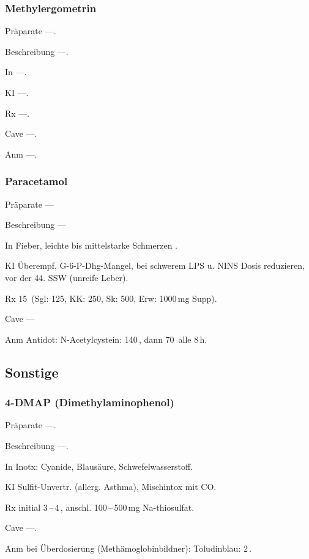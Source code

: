 \subsubsection{Methylergometrin}

\begin{labeling}[:]{mm}
  \item[Präparate] ---.
  \item[Beschreibung] ---.
  \item[In] ---.
  \item[KI] ---.
  \item[Rx] ---.
  \item[Cave] ---.
  \item[Anm] ---.
\end{labeling}


\subsubsection{Paracetamol}

\begin{labeling}[:]{mm}
  \item[Präparate] ---
  \item[Beschreibung] ---
  \item[In]  Fieber, leichte bis mittelstarke Schmerzen .
  \item[KI] Überempf, G-6-P-Dhg-Mangel, bei schwerem LPS u. NINS Dosis
reduzieren, vor der 44. SSW (unreife Leber).
  \item[Rx] 15\, (Sgl: 125, KK: 250, Sk: 500, Erw: 1000\,mg
  Supp).
  \item[Cave] ---
  \item[Anm] Antidot: N-Acetylcystein: 140\,, dann
  70\, alle 8\,h.
\end{labeling}



\subsection{Sonstige}


\subsubsection{4-DMAP (Dimethylaminophenol)}


\begin{labeling}[:]{mm}
  \item[Präparate] ---.
  \item[Beschreibung] ---.
  \item[In]  Inotx: Cyanide, Blausäure,
Schwefelwasserstoff.
  \item[KI] Sulfit-Unvertr. (allerg. Asthma), Mischintox mit CO.
  \item[Rx] initial 3\,--\,4\,, anschl. 100\,--\,500\,mg
  Na-thiosulfat.
  \item[Cave] ---.
  \item[Anm] bei Überdosierung (Methämoglobinbildner): Toludinblau: 2\,.
\end{labeling}




